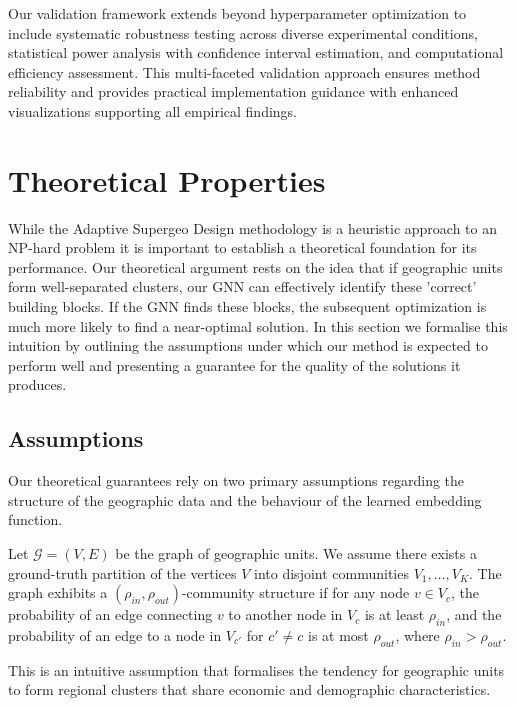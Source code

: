 \documentclass[final,3p,fleqn, 10pt]{elsarticle}
\begin{document}
    Our validation framework extends beyond hyperparameter optimization to include systematic robustness testing across diverse experimental conditions, statistical power analysis with confidence interval estimation, and computational efficiency assessment. This multi-faceted validation approach ensures method reliability and provides practical implementation guidance with enhanced visualizations supporting all empirical findings.


\section{Theoretical Properties}
\label{sec:theory}
While the Adaptive Supergeo Design methodology is a heuristic approach to an NP-hard problem it is important to establish a theoretical foundation for its performance. Our theoretical argument rests on the idea that if geographic units form well-separated clusters, our GNN can effectively identify these 'correct' building blocks. If the GNN finds these blocks, the subsequent optimization is much more likely to find a near-optimal solution. In this section we formalise this intuition by outlining the assumptions under which our method is expected to perform well and presenting a guarantee for the quality of the solutions it produces.

    \subsection{Assumptions}
    Our theoretical guarantees rely on two primary assumptions regarding the structure of the geographic data and the behaviour of the learned embedding function.

    \begin{assumption}\label{assump:community}
    Let $\mathcal{G} = (V, E)$ be the graph of geographic units. We assume there exists a ground-truth partition of the vertices $V$ into disjoint communities $V_1, \dots, V_K$. The graph exhibits a $(\rho_{in}, \rho_{out})$-community structure if for any node $v \in V_c$, the probability of an edge connecting $v$ to another node in $V_c$ is at least $\rho_{in}$, and the probability of an edge to a node in $V_{c'}$ for $c' \neq c$ is at most $\rho_{out}$, where $\rho_{in} > \rho_{out}$.
    \end{assumption}
    
    This is an intuitive assumption that formalises the tendency for geographic units to form regional clusters that share economic and demographic characteristics.
\end{document}
